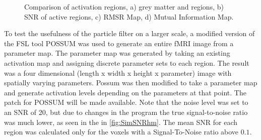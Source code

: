 \begin{figure}

\caption{Comparison of activation regions, a) grey matter and regions, b) \ac{SNR} of active
regions, c) \acl{RMSR} Map, d) Mutual Information Map.}
\label{fig:simslice_hm}
\end{figure}

To test the usefulness of the particle filter on a larger scale, a modified version
of the \ac{FSL} tool
\ac{POSSUM} was used to generate an entire \ac{fMRI} image from a parameter map. The parameter map was generated
by taking an existing activation map and assigning discrete parameter sets to each region.
The result was a four dimensional (length x width
x height x parameter) image with spatially varying parameters. Possum was then modified
to take a parameter map and generate activation levels depending on the parameters at that
point. The patch for \ac{POSSUM} will be made available. Note that the noise
level was set to an \ac{SNR} of 20, but due to changes
in the program the true signal-to-noise ratio was much lower, as seen in the
in \autoref{fig:SimSNRhm}. The mean \ac{SNR} for each region was calculated only for the
voxels with a Signal-To-Noise ratio above $0.1$.

